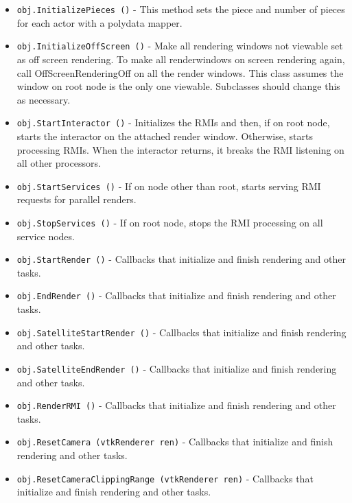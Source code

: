 \begin{itemize}
\item  \verb|obj.InitializePieces ()| -  This method sets the piece and number of pieces for each
 actor with a polydata mapper.

\item  \verb|obj.InitializeOffScreen ()| -  Make all rendering windows not viewable set as off screen rendering.
 To make all renderwindows on screen rendering again, call
 OffScreenRenderingOff on all the render windows.  This class assumes
 the window on root node is the only one viewable.  Subclasses should
 change this as necessary.

\item  \verb|obj.StartInteractor ()| -  Initializes the RMIs and then, if on root node, starts the interactor
 on the attached render window.  Otherwise, starts processing RMIs.
 When the interactor returns, it breaks the RMI listening on all other
 processors.

\item  \verb|obj.StartServices ()| -  If on node other than root, starts serving RMI requests for parallel
 renders.

\item  \verb|obj.StopServices ()| -  If on root node, stops the RMI processing on all service nodes.

\item  \verb|obj.StartRender ()| -  Callbacks that initialize and finish rendering and other tasks.

\item  \verb|obj.EndRender ()| -  Callbacks that initialize and finish rendering and other tasks.

\item  \verb|obj.SatelliteStartRender ()| -  Callbacks that initialize and finish rendering and other tasks.

\item  \verb|obj.SatelliteEndRender ()| -  Callbacks that initialize and finish rendering and other tasks.

\item  \verb|obj.RenderRMI ()| -  Callbacks that initialize and finish rendering and other tasks.

\item  \verb|obj.ResetCamera (vtkRenderer ren)| -  Callbacks that initialize and finish rendering and other tasks.

\item  \verb|obj.ResetCameraClippingRange (vtkRenderer ren)| -  Callbacks that initialize and finish rendering and other tasks.


\end{itemize}
